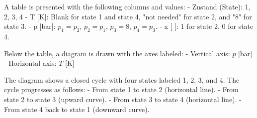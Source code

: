 A table is presented with the following columns and values:  
- Zustand (State): 1, 2, 3, 4  
- T [K]: Blank for state 1 and state 4, "not needed" for state 2, and "8" for state 3.  
- p [bar]: \( p_1 = p_2 \), \( p_2 = p_1 \), \( p_3 = 8 \), \( p_4 = p_3 \).  
- x [ ]: 1 for state 2, 0 for state 4.  

Below the table, a diagram is drawn with the axes labeled:  
- Vertical axis: \( p \) [bar]  
- Horizontal axis: \( T \) [K]  

The diagram shows a closed cycle with four states labeled 1, 2, 3, and 4. The cycle progresses as follows:  
- From state 1 to state 2 (horizontal line).  
- From state 2 to state 3 (upward curve).  
- From state 3 to state 4 (horizontal line).  
- From state 4 back to state 1 (downward curve).